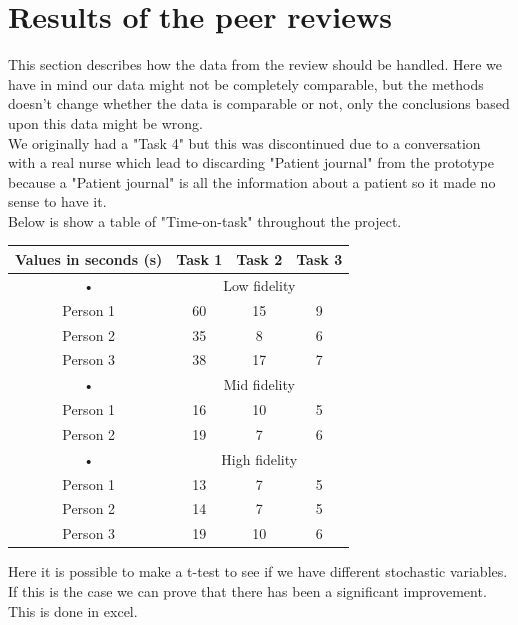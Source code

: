 \section{Results of the peer reviews}
This section describes how the data from the review should be handled. Here we have in mind our data might not be completely comparable, but the methods doesn't change whether the data is comparable or not, only the conclusions based upon this data might be wrong. \\
We originally had a "Task 4" but this was discontinued due to a conversation with a real nurse which lead to discarding "Patient journal" from the prototype because a "Patient journal" is all the information about a patient so it made no sense to have it.\\
Below is show a table of "Time-on-task" throughout the project.\\
\begin{table}[H]
\centering
\begin{tabular}{|c|c|c|c|}
\hline 
Values in seconds (s) & Task 1 & Task 2 & Task 3 \\ 
\hline 
• & \multicolumn{3}{c|}{Low fidelity} \\ 
\hline 
Person 1 & 60 & 15 & 9 \\ 
\hline 
Person 2 & 35 & 8 & 6 \\ 
\hline 
Person 3 & 38 & 17 & 7 \\ 
\hline 
• & \multicolumn{3}{c|}{Mid fidelity} \\ 
\hline 
Person 1 & 16 & 10 & 5 \\ 
\hline 
Person 2 & 19 & 7 & 6 \\ 
\hline 
• & \multicolumn{3}{c|}{High fidelity} \\ 
\hline 
Person 1 & 13 & 7 & 5 \\ 
\hline 
Person 2 & 14 & 7 & 5 \\ 
\hline 
Person 3 & 19 & 10 & 6 \\ 
\hline 
\end{tabular} 
\end{table}
Here it is possible to make a t-test to see if we have different stochastic variables. If this is the case we can prove that there has been a significant improvement. This is done in excel.\\


